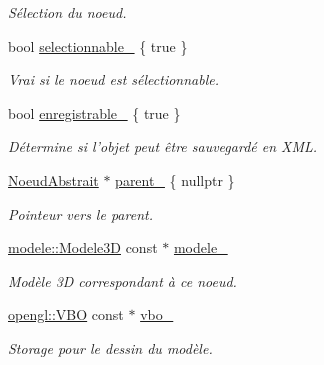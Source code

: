 \begin{DoxyCompactItemize}
\begin{DoxyCompactList}\small\item\em Sélection du noeud. \end{DoxyCompactList}\item 
\hypertarget{class_noeud_abstrait_a2e5d12f2a106f410e149263fa72a530f}{bool \hyperlink{class_noeud_abstrait_a2e5d12f2a106f410e149263fa72a530f}{selectionnable\-\_\-} \{ true \}}\label{class_noeud_abstrait_a2e5d12f2a106f410e149263fa72a530f}

\begin{DoxyCompactList}\small\item\em Vrai si le noeud est sélectionnable. \end{DoxyCompactList}\item 
\hypertarget{class_noeud_abstrait_aa4b43e83161e8650b8810c8e29f0c985}{bool \hyperlink{class_noeud_abstrait_aa4b43e83161e8650b8810c8e29f0c985}{enregistrable\-\_\-} \{ true \}}\label{class_noeud_abstrait_aa4b43e83161e8650b8810c8e29f0c985}

\begin{DoxyCompactList}\small\item\em Détermine si l'objet peut être sauvegardé en X\-M\-L. \end{DoxyCompactList}\item 
\hypertarget{class_noeud_abstrait_a002558def0146fea8c413c7928b962a1}{\hyperlink{class_noeud_abstrait}{Noeud\-Abstrait} $\ast$ \hyperlink{class_noeud_abstrait_a002558def0146fea8c413c7928b962a1}{parent\-\_\-} \{ nullptr \}}\label{class_noeud_abstrait_a002558def0146fea8c413c7928b962a1}

\begin{DoxyCompactList}\small\item\em Pointeur vers le parent. \end{DoxyCompactList}\item 
\hypertarget{class_noeud_abstrait_abc3dc8e24578214b7c6081be3246645e}{\hyperlink{classmodele_1_1_modele3_d}{modele\-::\-Modele3\-D} const $\ast$ \hyperlink{class_noeud_abstrait_abc3dc8e24578214b7c6081be3246645e}{modele\-\_\-}}\label{class_noeud_abstrait_abc3dc8e24578214b7c6081be3246645e}

\begin{DoxyCompactList}\small\item\em Modèle 3\-D correspondant à ce noeud. \end{DoxyCompactList}\item 
\hypertarget{class_noeud_abstrait_ae53668f6c4df669a0923a16b3cb84f83}{\hyperlink{classopengl_1_1_v_b_o}{opengl\-::\-V\-B\-O} const $\ast$ \hyperlink{class_noeud_abstrait_ae53668f6c4df669a0923a16b3cb84f83}{vbo\-\_\-}}\label{class_noeud_abstrait_ae53668f6c4df669a0923a16b3cb84f83}

\begin{DoxyCompactList}\small\item\em Storage pour le dessin du modèle. \end{DoxyCompactList}\end{DoxyCompactItemize}


